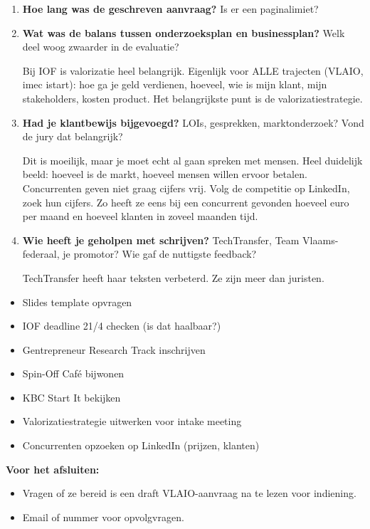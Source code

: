 \documentclass[11pt,a4paper]{article}
\newcommand{\notebox}{%
\begin{tcolorbox}[colback=notebg, colframe=noteborder, boxrule=0.5pt, arc=2pt, left=4pt, right=4pt, top=2pt, bottom=2pt]
\vspace{2.2cm}
\end{tcolorbox}
}
\newcommand{\filledbox}[1]{%
\begin{tcolorbox}[colback=notebg, colframe=noteborder, boxrule=0.5pt, arc=2pt, left=4pt, right=4pt, top=2pt, bottom=2pt]
#1
\end{tcolorbox}
}
\begin{document}
\begin{enumerate}[resume]

\item \textbf{Hoe lang was de geschreven aanvraag?} Is er een paginalimiet?

\notebox

\item \textbf{Wat was de balans tussen onderzoeksplan en businessplan?} Welk deel woog zwaarder in de evaluatie?

\filledbox{Bij IOF is valorizatie heel belangrijk. Eigenlijk voor ALLE trajecten (VLAIO, imec istart): hoe ga je geld verdienen, hoeveel, wie is mijn klant, mijn stakeholders, kosten product. Het belangrijkste punt is de valorizatiestrategie.}

\item \textbf{Had je klantbewijs bijgevoegd?} LOIs, gesprekken, marktonderzoek? Vond de jury dat belangrijk?

\filledbox{Dit is moeilijk, maar je moet echt al gaan spreken met mensen. Heel duidelijk beeld: hoeveel is de markt, hoeveel mensen willen ervoor betalen. Concurrenten geven niet graag cijfers vrij. Volg de competitie op LinkedIn, zoek hun cijfers. Zo heeft ze eens bij een concurrent gevonden hoeveel euro per maand en hoeveel klanten in zoveel maanden tijd.}

\item \textbf{Wie heeft je geholpen met schrijven?} TechTransfer, Team Vlaams-federaal, je promotor? Wie gaf de nuttigste feedback?

\filledbox{TechTransfer heeft haar teksten verbeterd. Ze zijn meer dan juristen.}

\end{enumerate}

\vspace{1em}
\begin{tcolorbox}[colback=white, colframe=accent, boxrule=1pt, arc=3pt, title={\textbf{Opvolging}}, fonttitle=\bfseries\color{white}, colbacktitle=accent]
\begin{itemize}[leftmargin=*, itemsep=0.3em]
\item Slides template opvragen
\item IOF deadline 21/4 checken (is dat haalbaar?)
\item Gentrepreneur Research Track inschrijven
\item Spin-Off Caf\'e bijwonen
\item KBC Start It bekijken
\item Valorizatiestrategie uitwerken voor intake meeting
\item Concurrenten opzoeken op LinkedIn (prijzen, klanten)
\end{itemize}
\end{tcolorbox}

\vspace{0.5em}
\noindent\textbf{Voor het afsluiten:}
\begin{itemize}[leftmargin=*]
\item Vragen of ze bereid is een draft VLAIO-aanvraag na te lezen voor indiening.
\item Email of nummer voor opvolgvragen.
\end{itemize}
\end{document}
